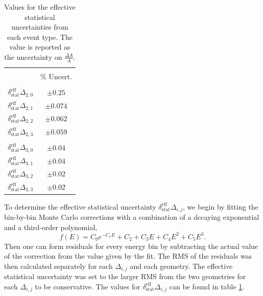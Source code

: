 \setlength{\tabcolsep}{12pt}

\begin{table}[h]
  \caption{Values for the effective statistical uncertainties from each
  event type. The value is reported as the uncertainty on $\frac{\Delta A}{A}$.} 
  \centering
  \begin{tabular}{l c }
    \hline \hline \\ [-1.75ex]
    & \% Uncert. \\
    \hline \\ [-1.75ex]
    $\delta^{\mathrm{eff}}_{\mathrm{stat}}\Delta_{2,0}$ & $\pm0.25$ \\ [0.50ex]
    $\delta^{\mathrm{eff}}_{\mathrm{stat}}\Delta_{2,1}$ & $\pm0.074$ \\ [0.50ex]
    $\delta^{\mathrm{eff}}_{\mathrm{stat}}\Delta_{2,2}$ & $\pm0.062$ \\ [0.50ex]
    $\delta^{\mathrm{eff}}_{\mathrm{stat}}\Delta_{2,3}$ & $\pm0.059$  \\ [0.50ex]
    \hline \\ [-1.75ex]
    $\delta^{\mathrm{eff}}_{\mathrm{stat}}\Delta_{3,0}$ & $\pm0.04$ \\ [0.50ex]
    $\delta^{\mathrm{eff}}_{\mathrm{stat}}\Delta_{3,1}$ & $\pm0.04$ \\ [0.50ex]
    $\delta^{\mathrm{eff}}_{\mathrm{stat}}\Delta_{3,2}$ & $\pm0.02$ \\ [0.50ex]
    $\delta^{\mathrm{eff}}_{\mathrm{stat}}\Delta_{3,3}$ & $\pm0.02$  \\ [0.50ex]
    \hline
  \end{tabular}
  \label{tab:effStat}
\end{table}

To determine the effective statistical uncertainty $\delta^{\mathrm{eff}}_{\mathrm{stat}}\Delta_{i,j}$,
we begin by fitting the bin-by-bin Monte Carlo corrections with a combination of a decaying exponential
and a third-order polynomial,
%
\begin{equation}
  f(E) = C_0 e^{-C_1E} + C_2 + C_3E + C_4E^2 + C_5E^3.
\end{equation}
%
\noindent Then one can form residuals for every energy bin by subtracting the actual value
of the correction from the value given by the fit. The RMS of the residuals was
then calculated
separately for each $\Delta_{i,j}$ and each geometry. The effective statistical uncertainty
was set to the larger RMS from the two geometries for each $\Delta_{i,j}$ to be conservative.
The values for $\delta^{\mathrm{eff}}_{\mathrm{stat}}\Delta_{i,j}$
can be found in table \ref{tab:effStat}.

